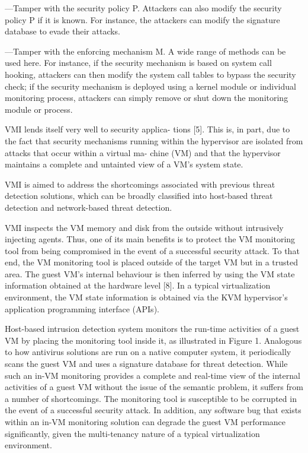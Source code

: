 \documentclass{report}
\begin{document}
\begin{spacing}{1.5}
—Tamper with the security policy P. Attackers can also modify the security policy P if
it is known. For instance, the attackers can modify the signature database to evade
their attacks.

—Tamper with the enforcing mechanism M. A wide range of methods can be used here.
For instance, if the security mechanism is based on system call hooking, attackers
can then modify the system call tables to bypass the security check; if the security
mechanism is deployed using a kernel module or individual monitoring process,
attackers can simply remove or shut down the monitoring module or process.





VMI lends itself very well to security applica-
tions [5]. This is, in part, due to the fact that security mechanisms running
within the hypervisor are isolated from attacks that occur within a virtual ma-
chine (VM) and that the hypervisor maintains a complete and untainted view
of a VM’s system state.


{\large
VMI is aimed to address the shortcomings associated with previous threat detection solutions, which can be broadly classified into host-based threat detection and network-based threat detection.

VMI inspects the VM memory and disk from the outside without intrusively injecting agents. Thus, one of its main benefits is to protect the VM monitoring tool from being compromised in the event of a successful security attack. To that end, the VM monitoring tool is placed outside of the target VM but in a trusted area. The guest VM’s internal behaviour is then inferred by using the VM state information obtained at the hardware level [8]. In a typical virtualization environment, the VM state information is obtained via the KVM hypervisor's application programming interface (APIs).

Host-based intrusion detection system monitors the run-time activities of a guest VM by placing the monitoring tool inside it, as illustrated in Figure 1. Analogous to how antivirus solutions are run on a native computer system, it periodically
scans the guest VM and uses a signature database for threat detection. While such an in-VM monitoring provides a complete and real-time view of the internal activities of a guest VM without the issue of the semantic problem, it suffers from a number of shortcomings. The monitoring tool is susceptible to be corrupted in the event of a successful security attack. In addition, any software bug that exists within an in-VM monitoring solution can degrade the guest VM performance significantly, given the multi-tenancy nature of a typical virtualization environment.

}
\end{spacing}
\end{document}
